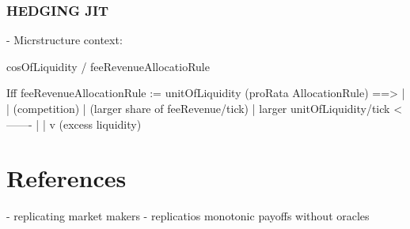 \documentclass[11pt]{article}
\begin{document}
                 
\subsubsection{HEDGING JIT}
- Micrstructure context:

\partial cosOfLiquidity / \partial feeRevenueAllocatioRule 

Iff feeRevenueAllocationRule := \propto unitOfLiquidity (proRata AllocationRule) ==> 
                                                                 |
                                                                 |
                                                             (competition)
                                                                 |
                                                       (larger share of feeRevenue/tick)
                                                                 |
                      larger unitOfLiquidity/tick          <-------   
                                 |
                                 |
                                 v
                         (excess liquidity)
                      
\section{References}

- replicating market makers
- replicatios monotonic payoffs without oracles
\end{document}
